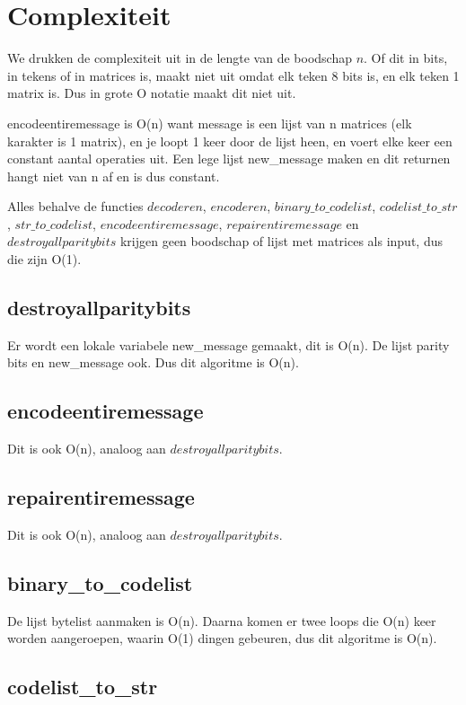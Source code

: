 \documentclass[a4paper]{article}
\begin{document}
\section{Complexiteit}
We drukken de complexiteit uit in de lengte van de boodschap \(n\). Of dit in bits, in tekens of in matrices is, maakt niet uit omdat elk teken 8 bits is, en elk teken 1 matrix is. Dus in grote O notatie maakt dit niet uit.

encodeentiremessage is O(n) want message is een lijst van n matrices (elk karakter is 1 matrix), en je loopt 1 keer door de lijst heen, en voert elke keer een constant aantal operaties uit. Een lege lijst new\_message maken en dit returnen hangt niet van n af en is dus constant.

Alles behalve de functies $decoderen$, $encoderen$, $binary\_to\_codelist$, $codelist\_to\_str$, $str\_to\_codelist$, $encodeentiremessage$, $repairentiremessage$ en $destroyallparitybits$ krijgen geen boodschap of lijst met matrices als input, dus die zijn O(1). 

\subsection{destroyallparitybits}

Er wordt een lokale variabele new\_message gemaakt, dit is O(n). De lijst parity bits en new\_message ook. Dus dit algoritme is O(n).

\subsection{encodeentiremessage}

Dit is ook O(n), analoog aan $destroyallparitybits$.

\subsection{repairentiremessage}

Dit is ook O(n), analoog aan $destroyallparitybits$.

\subsection{binary\_to\_codelist}

De lijst bytelist aanmaken is O(n). Daarna komen er twee loops die O(n) keer worden aangeroepen, waarin O(1) dingen gebeuren, dus dit algoritme is O(n).

\subsection{codelist\_to\_str}
\end{document}
